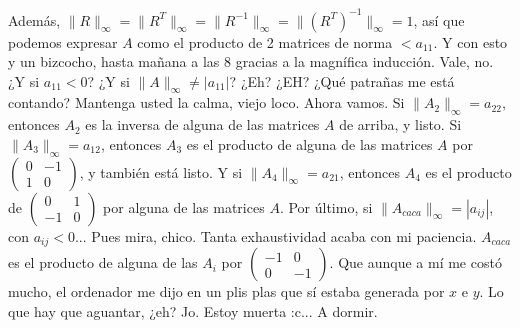 \documentclass{article}
\newcommand\tab[1][0.6cm]{\hspace*{#1}}
\newcommand\nl{\newline\tab}
\begin{document}
	Además, $\|R\|_\infty = \|R^T\|_\infty = \|R^{-1}\|_\infty = \|\left( R^T\right) ^{-1}\|_\infty=1$, así que podemos expresar $A$ como el producto de 2 matrices de norma $< a_{11}$.\nl\nl
	Y con esto y un bizcocho, hasta mañana a las 8 gracias a la magnífica inducción. \nl
	Vale, no. ¿Y si $a_{11} < 0$? ¿Y si $\|A\|_\infty \neq |a_{11}|$? ¿Eh? ¿EH? ¿Qué patrañas me está contando? \nl
	Mantenga usted la calma, viejo loco. Ahora vamos.\nl\nl
	Si $\|A_2\|_\infty = a_{22}$, entonces $A_2$ es la inversa de alguna de las matrices $A$ de arriba, y listo.\nl
	Si $\|A_3\|_\infty = a_{12}$, entonces $A_3$ es el producto de alguna de las matrices $A$ por
	$\begin{pmatrix}
	0 & -1 \\
	1 & 0 
	\end{pmatrix} $,
	y también está listo.\nl 
	Y si $\|A_4\|_\infty = a_{21}$, entonces $A_4$ es el producto de
	$\begin{pmatrix}
	0 & 1 \\
	-1 & 0 
	\end{pmatrix} $ por alguna de las matrices $A$.\nl
	Por último, si $\|A_{caca}\|_\infty = |a_{ij}|$, con $a_{ij} < 0$... Pues mira, chico. Tanta exhaustividad acaba con mi paciencia. $A_{caca}$ es el producto de alguna de las $A_i$ por  $\begin{pmatrix}
	-1 & 0 \\
	0 & -1 
	\end{pmatrix} $. Que aunque a mí me costó mucho, el ordenador me dijo en un plis plas que sí estaba generada por $x$ e $y$. Lo que hay que aguantar, ¿eh? 	\nl 		
	Jo. Estoy muerta :c... A dormir.
	
\end{document}
